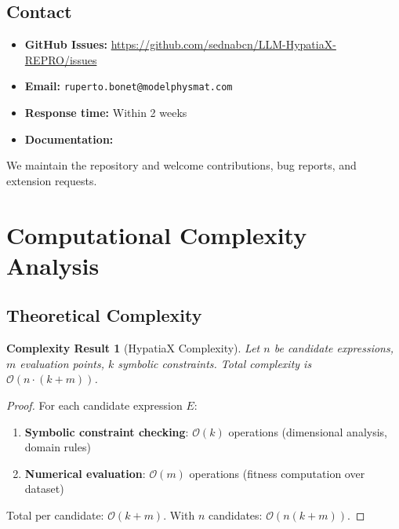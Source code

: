 \documentclass[twoside,11pt]{article}
\newtheorem{complexity}{Complexity Result}
\providecommand{\qed}{\hfill\BlackBox}
\begin{document}
\subsection{Contact}

\begin{itemize}
\item \textbf{GitHub Issues:} \url{https://github.com/sednabcn/LLM-HypatiaX-REPRO/issues}
\item \textbf{Email:} \texttt{ruperto.bonet@modelphysmat.com}
\item \textbf{Response time:} Within 2 weeks
\item \textbf{Documentation:} 
\end{itemize}

We maintain the repository and welcome contributions, bug reports, and extension requests.



\section{Computational Complexity Analysis}
\label{app:complexity}

\subsection{Theoretical Complexity}

\begin{complexity}[HypatiaX Complexity]
Let $n$ be candidate expressions, $m$ evaluation points, $k$ symbolic constraints. Total complexity is $\mathcal{O}(n \cdot (k + m))$.
\end{complexity}

\begin{proof}
For each candidate expression $E$:
\begin{enumerate}
\item \textbf{Symbolic constraint checking}: $\mathcal{O}(k)$ operations (dimensional analysis, domain rules)
\item \textbf{Numerical evaluation}: $\mathcal{O}(m)$ operations (fitness computation over dataset)
\end{enumerate}

Total per candidate: $\mathcal{O}(k + m)$. With $n$ candidates: $\mathcal{O}(n(k + m))$. \qed
\end{proof}
\end{document}
